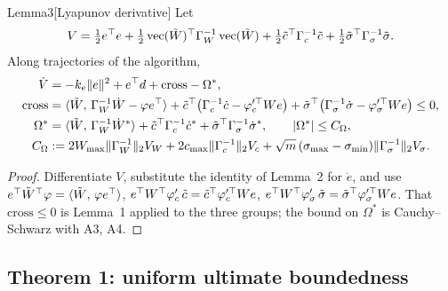 \begin{thm}{Lemma}{3}[Lyapunov derivative]
Let
\[
V=\tfrac12e^\top e+\tfrac12\operatorname{vec}(\tilde W)^\top\Gamma_W^{-1}\operatorname{vec}(\tilde W)
+\tfrac12\tilde c^\top\Gamma_c^{-1}\tilde c+\tfrac12\tilde\sigma^\top\Gamma_\sigma^{-1}\tilde\sigma.
\]
Along trajectories of the algorithm,
\begin{align}
\dot V&=-k_e\lVert e\rVert^2+e^\top d+\mathrm{cross}-\Omega^*,\label{eq:part1:Vdot}\\
\mathrm{cross}&=\langle \tilde W,\, \Gamma_W^{-1}\dot W-\varphi e^\top\rangle
  +\tilde c^\top\bigl(\Gamma_c^{-1}\dot c-\varphi_c'^{\top}We\bigr)
  +\tilde\sigma^\top\bigl(\Gamma_\sigma^{-1}\dot\sigma-\varphi_\sigma'^{\top}We\bigr)\le0,\notag\\
\Omega^*&=\langle \tilde W,\, \Gamma_W^{-1}\dot W^*\rangle+\tilde c^\top\Gamma_c^{-1}\dot c^*
  +\tilde\sigma^\top\Gamma_\sigma^{-1}\dot\sigma^*,\qquad \lvert \Omega^*\rvert\le C_\Omega,\notag\\
C_\Omega&:=2W_{\max}\lVert \Gamma_W^{-1}\rVert_2V_W+2c_{\max}\lVert \Gamma_c^{-1}\rVert_2V_c
  +\sqrt m\,(\sigma_{\max}-\sigma_{\min})\lVert \Gamma_\sigma^{-1}\rVert_2V_\sigma.\notag
\end{align}
\end{thm}

\begin{proof}
Differentiate $V$, substitute the identity of Lemma~2 for $\dot e$, and use
$e^\top\tilde W^\top\varphi=\langle \tilde W,\, \varphi e^\top\rangle$, $e^\top W^\top\varphi'_c\,\tilde c=\tilde c^\top\varphi_c'^{\top}We$,
$e^\top W^\top\varphi'_\sigma\,\tilde\sigma=\tilde\sigma^\top\varphi_\sigma'^{\top}We$. That $\mathrm{cross}\le0$ is Lemma~1
applied to the three groups; the bound on $\Omega^*$ is Cauchy--Schwarz with A3, A4.
\end{proof}

\subsection{Theorem 1: uniform ultimate boundedness}

